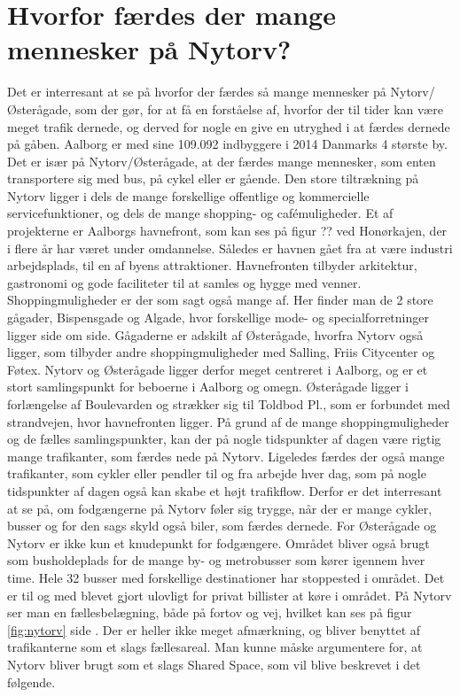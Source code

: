 \section{Hvorfor færdes der mange mennesker på Nytorv?}
\label{sec:hvorfor_faerdes_der_mange_mennesker_paa_nytorv?}
Det er interresant at se på hvorfor der færdes så mange mennesker på Nytorv/Østerågade, som der gør, for at få en forståelse af, hvorfor der til tider kan være meget trafik dernede, og derved for nogle en give en utryghed i at færdes dernede på gåben.
Aalborg er med sine 109.092 indbyggere i 2014 Danmarks 4 største by.%
Det er især på Nytorv/Østerågade, at der færdes mange mennesker, som enten transportere sig med bus, på cykel eller er gående. Den store tiltrækning på Nytorv ligger i dels de mange forskellige offentlige og kommercielle servicefunktioner, og dels de mange shopping- og cafémuligheder. 
Et af projekterne er Aalborgs havnefront, som kan ses på figur ?? ved Honørkajen, der i flere år har været under omdannelse. Således er havnen gået fra at være industri arbejdsplads, til en af byens attraktioner. Havnefronten tilbyder arkitektur, gastronomi og gode faciliteter til at samles og hygge med venner.
Shoppingmuligheder er der som sagt også mange af. Her finder man de 2 store gågader, Bispensgade og Algade, hvor forskellige mode- og specialforretninger ligger side om side. Gågaderne er adskilt af Østerågade, hvorfra Nytorv også ligger, som tilbyder andre shoppingmuligheder med Salling, Friis Citycenter og Føtex.
Nytorv og Østerågade ligger derfor meget centreret i Aalborg, og er et stort samlingspunkt for beboerne i Aalborg og omegn. Østerågade ligger i forlængelse af Boulevarden og strækker sig til Toldbod Pl., som er forbundet med strandvejen, hvor havnefronten ligger. På grund af de mange shoppingmuligheder og de fælles samlingspunkter, kan der på nogle tidspunkter af dagen være rigtig mange trafikanter, som færdes nede på Nytorv. Ligeledes færdes der også mange trafikanter, som cykler eller pendler til og fra arbejde hver dag, som på nogle tidspunkter af dagen også kan skabe et højt trafikflow. Derfor er det interresant at se på, om fodgængerne på Nytorv føler sig trygge, når der er mange cykler, busser og for den sags skyld også biler, som færdes dernede. For Østerågade og Nytorv er ikke kun et knudepunkt for fodgængere. Området bliver også brugt som busholdeplads for de mange by- og metrobusser som kører igennem hver time. Hele 32 busser med forskellige destinationer har stoppested i området. Det er til og med blevet gjort ulovligt for privat billister at køre i området.  På Nytorv ser man en fællesbelægning, både på fortov og vej, hvilket kan ses på figur \cref{fig:nytorv} side \pageref{fig:nytorv}. Der er heller ikke meget afmærkning, og bliver benyttet af trafikanterne som et slags fællesareal. Man kunne måske argumentere for, at Nytorv bliver brugt som et slags Shared Space, som vil blive beskrevet i det følgende. 